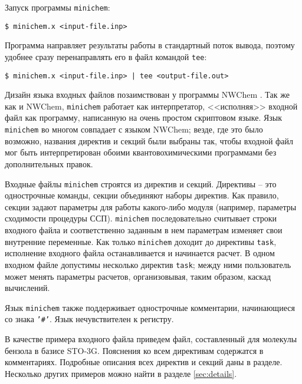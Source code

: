 \documentclass[a4paper, 12pt]{article}
\begin{document}
Запуск программы \texttt{minichem}:
\begin{lstlisting}
$ minichem.x <input-file.inp>
\end{lstlisting}

Программа направляет результаты работы в стандартный поток вывода, поэтому удобнее сразу перенаправлять его в файл командой \texttt{tee}:
\begin{lstlisting}
$ minichem.x <input-file.inp> | tee <output-file.out>
\end{lstlisting}

Дизайн языка входных файлов позаимствован у программы NWChem \cite{nwchem2010}. Так же как и NWChem, \texttt{minichem} работает как интерпретатор, <<исполняя>> входной файл как программу, написанную на очень простом скриптовом языке. Язык \texttt{minichem} во многом совпадает с языком NWChem; везде, где это было возможно, названия директив и секций были выбраны так, чтобы входной файл мог быть интерпретирован обоими квантовохимическими программами без дополнительных правок.

Входные файлы \texttt{minichem} строятся из директив и секций. Директивы -- это однострочные команды, секции объединяют наборы директив. Как правило, секции задают параметры для работы какого-либо модуля (например, параметры сходимости процедуры ССП). \texttt{minichem} последовательно считывает строки входного файла и соответственно заданным в нем параметрам изменяет свои внутренние переменные. Как только \texttt{minichem} доходит до директивы \texttt{task}, исполнение входного файла останавливается и начинается расчет. В одном входном файле допустимы несколько директив \texttt{task}; между ними пользователь может менять параметры расчетов, организовывая, таким образом, каскад вычислений.

Язык \texttt{minichem} также поддерживает однострочные комментарии, начинающиеся со знака \texttt{'\#'}. Язык нечувствителен к регистру.

В качестве примера входного файла приведем файл, составленный для молекулы бензола в базисе STO-3G. Пояснения ко всем директивам содержатся в комментариях.
Подробные описания всех директив и секций даны в разделе. Несколько других примеров можно найти в разделе \ref{sec:details}.
\end{document}

